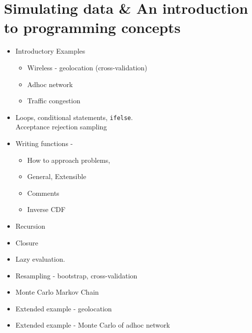 \documentclass[11pt,timesroman]{article}
\begin{document}
\section{Simulating data \& An introduction to programming concepts}
        \begin{itemize}
          \item Introductory Examples
            \begin{itemize}
              \item Wireless - geolocation (cross-validation)
              \item Adhoc network
              \item Traffic congestion
            \end{itemize}
        \item Loops, conditional statements, \texttt{ifelse}.
          \\Acceptance rejection sampling
        \item Writing functions - 
                \begin{itemize}
                \item How to approach problems,
                \item General, Extensible
                \item Comments
                \item Inverse CDF
                \end{itemize}
        \item Recursion
        \item Closure
        \item Lazy evaluation.
        \item Resampling - bootstrap, cross-validation
        \item Monte Carlo Markov Chain
        \item Extended example - geolocation
        \item Extended example - Monte Carlo of adhoc network
        \end{itemize}
\end{document}
